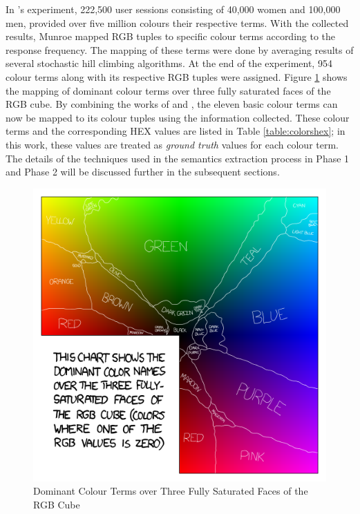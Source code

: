 In 's experiment, 222,500 user sessions consisting of 40,000 women and 100,000 men, provided over five million colours their respective terms. With the collected results, Munroe mapped RGB tuples to specific colour terms according to the response frequency.
The mapping of these terms were done by averaging results of several stochastic hill climbing algorithms. At the end of the experiment, 954 colour terms along with its respective RGB tuples were assigned.
Figure \ref{fig:xkcd} shows the mapping of dominant colour terms over three fully saturated faces of the RGB cube.
By combining the works of  and , the eleven basic colour terms can now be mapped to its colour tuples using the information collected. These colour terms and the corresponding HEX values are listed in Table \ref{table:colorshex}; in this work, these values are treated as \textit{ground truth} values for each colour term.
The details of the techniques used in the semantics extraction process in Phase 1 and Phase 2 will be discussed further in the subsequent sections.

\begin{figure}[!hbt]\centering
\includegraphics[width=.6\textwidth]{image/general/xkcd.png}
\caption{Dominant Colour Terms over Three Fully Saturated Faces of the RGB Cube}
\label{fig:xkcd}
\end{figure}


